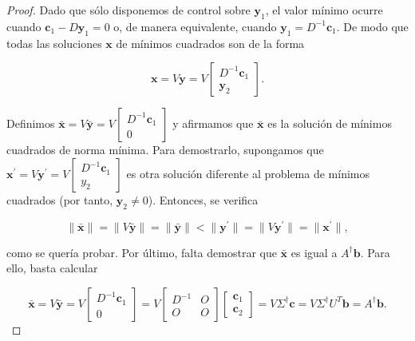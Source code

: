 \begin{proof}
    Dado que sólo disponemos de control sobre $\mathbf{y}_1$, el valor mínimo ocurre cuando $\mathbf{c}_1 - D \mathbf{y}_1 = 0$ o, de manera equivalente, cuando $\mathbf{y}_1 = D^{-1} \mathbf{c}_1$. De modo que todas las soluciones $\mathbf{x}$ de mínimos cuadrados son de la forma  

    \[
        \mathbf{x} = V \mathbf{y} = V \begin{bmatrix} D^{-1} \mathbf{c}_1 \\ \mathbf{y}_2 \end{bmatrix}.
    \]

    Definimos $\bar{\mathbf{x}} = V \bar{\mathbf{y}} = V \begin{bmatrix} D^{-1} \mathbf{c}_1 \\ 0 \end{bmatrix}$ y afirmamos que $\bar{\mathbf{x}}$ es la solución de mínimos cuadrados de norma mínima. Para demostrarlo, supongamos que $\mathbf{x}^{\prime}=V\mathbf{y}^{\prime} = V \begin{bmatrix} D^{-1} \mathbf{c}_1 \\ y_2 \end{bmatrix}$ es otra solución diferente al problema de mínimos cuadrados (por tanto, $\mathbf{y}_2 \neq 0$). Entonces, se verifica

    \[ \| \bar{\mathbf{x}} \| = \| V\bar{\mathbf{y}} \| = \| \bar{\mathbf{y}} \| < \| {\mathbf{y}^{\prime}} \| = \| V\mathbf{y}^{\prime} \| = \| \mathbf{x}^{\prime} \|,\]

    como se quería probar. Por último, falta demostrar que $\bar{\mathbf{x}}$ es igual a $A^{\dagger}\mathbf{b}$. Para ello, basta calcular

    \[ \bar{\mathbf{x}} = V\bar{\mathbf{y}} = V \begin{bmatrix} D^{-1} \mathbf{c}_1 \\ 0 \end{bmatrix} = V \begin{bmatrix} D^{-1} & O \\ O & O \end{bmatrix} \begin{bmatrix} \mathbf{c}_1 \\ \mathbf{c}_2 \end{bmatrix} = V \Sigma^{\dagger} \mathbf{c} = V \Sigma^{\dagger} U^{T} \mathbf{b} = A^{\dagger}\mathbf{b}.\]

    
\end{proof}


\endinput